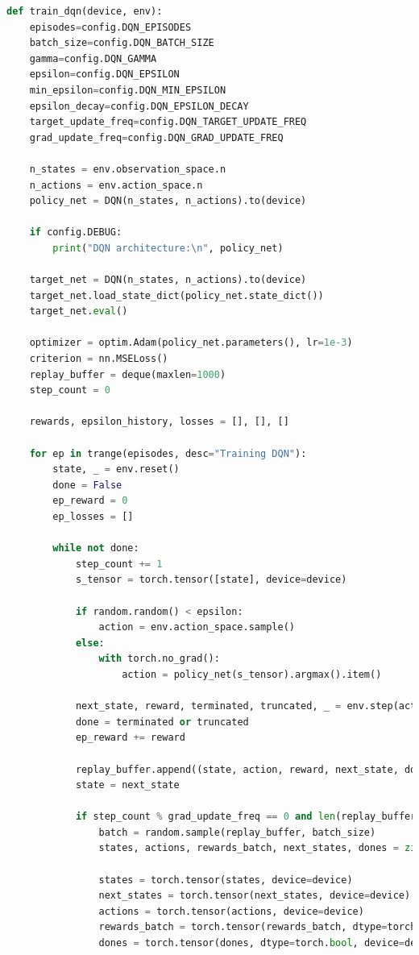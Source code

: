 \documentclass[a4paper,12pt]{article}
\begin{document}
\begin{lstlisting}[language=Python]
def train_dqn(device, env):
    episodes=config.DQN_EPISODES
    batch_size=config.DQN_BATCH_SIZE
    gamma=config.DQN_GAMMA
    epsilon=config.DQN_EPSILON
    min_epsilon=config.DQN_MIN_EPSILON
    epsilon_decay=config.DQN_EPSILON_DECAY
    target_update_freq=config.DQN_TARGET_UPDATE_FREQ
    grad_update_freq=config.DQN_GRAD_UPDATE_FREQ

    n_states = env.observation_space.n
    n_actions = env.action_space.n
    policy_net = DQN(n_states, n_actions).to(device)

    if config.DEBUG:
        print("DQN architecture:\n", policy_net)
        
    target_net = DQN(n_states, n_actions).to(device)
    target_net.load_state_dict(policy_net.state_dict())
    target_net.eval()

    optimizer = optim.Adam(policy_net.parameters(), lr=1e-3)
    criterion = nn.MSELoss()
    replay_buffer = deque(maxlen=1000)
    step_count = 0

    rewards, epsilon_history, losses = [], [], []

    for ep in trange(episodes, desc="Training DQN"):
        state, _ = env.reset()
        done = False
        ep_reward = 0
        ep_losses = []

        while not done:
            step_count += 1
            s_tensor = torch.tensor([state], device=device)

            if random.random() < epsilon:
                action = env.action_space.sample()
            else:
                with torch.no_grad():
                    action = policy_net(s_tensor).argmax().item()

            next_state, reward, terminated, truncated, _ = env.step(action)
            done = terminated or truncated
            ep_reward += reward

            replay_buffer.append((state, action, reward, next_state, done))
            state = next_state

            if step_count % grad_update_freq == 0 and len(replay_buffer) >= batch_size:
                batch = random.sample(replay_buffer, batch_size)
                states, actions, rewards_batch, next_states, dones = zip(*batch)

                states = torch.tensor(states, device=device)
                next_states = torch.tensor(next_states, device=device)
                actions = torch.tensor(actions, device=device)
                rewards_batch = torch.tensor(rewards_batch, dtype=torch.float32, device=device)
                dones = torch.tensor(dones, dtype=torch.bool, device=device)


\end{lstlisting}
\end{document}
